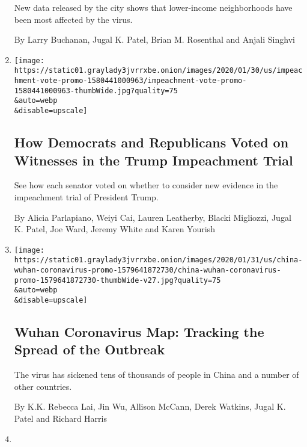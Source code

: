 \begin{enumerate}
  New data released by the city shows that lower-income neighborhoods
  have been most affected by the virus.

  By Larry Buchanan, Jugal K. Patel, Brian M. Rosenthal and Anjali
  Singhvi
\item
  \href{/interactive/2020/01/31/us/politics/impeachment-vote.html}{}

  \texttt{[image: https://static01.graylady3jvrrxbe.onion/images/2020/01/30/us/impeachment-vote-promo-1580441000963/impeachment-vote-promo-1580441000963-thumbWide.jpg?quality=75\\\&auto=webp\\\&disable=upscale]}

  \hypertarget{how-democrats-and-republicans-voted-on-witnesses-in-the-trump-impeachment-trial}{%
  \subsection{How Democrats and Republicans Voted on Witnesses in the
  Trump Impeachment
  Trial}\label{how-democrats-and-republicans-voted-on-witnesses-in-the-trump-impeachment-trial}}

  See how each senator voted on whether to consider new evidence in the
  impeachment trial of President Trump.

  By Alicia Parlapiano, Weiyi Cai, Lauren Leatherby, Blacki Migliozzi,
  Jugal K. Patel, Joe Ward, Jeremy White and Karen Yourish
\item
  \href{/interactive/2020/01/21/world/asia/china-coronavirus-maps.html}{}

  \texttt{[image: https://static01.graylady3jvrrxbe.onion/images/2020/01/31/us/china-wuhan-coronavirus-promo-1579641872730/china-wuhan-coronavirus-promo-1579641872730-thumbWide-v27.jpg?quality=75\\\&auto=webp\\\&disable=upscale]}

  \hypertarget{wuhan-coronavirus-map-tracking-the-spread-of-the-outbreak}{%
  \subsection{Wuhan Coronavirus Map: Tracking the Spread of the
  Outbreak}\label{wuhan-coronavirus-map-tracking-the-spread-of-the-outbreak}}

  The virus has sickened tens of thousands of people in China and a
  number of other countries.

  By K.K. Rebecca Lai, Jin Wu, Allison McCann, Derek Watkins, Jugal K.
  Patel and Richard Harris
\item
  \href{/interactive/2019/12/22/us/los-angeles-homeless-black-residents.html}{}


\end{enumerate}
